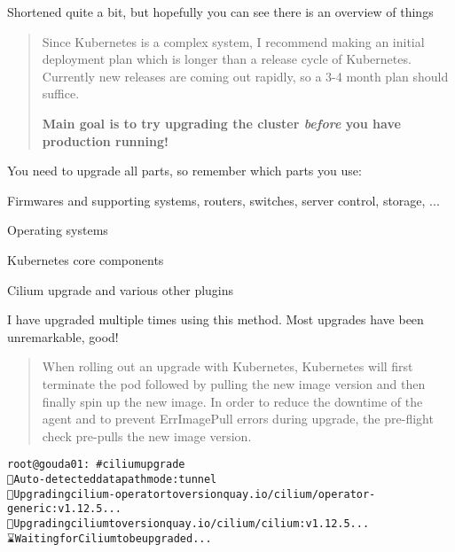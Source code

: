 \documentclass[Screen16to9,17pt]{foils}
\begin{document}
Shortened quite a bit, but hopefully you can see there is an overview of things







\begin{quote}
Since Kubernetes is a complex system, I recommend making an initial deployment plan which is longer than a release cycle of Kubernetes. Currently new releases are coming out rapidly, so a 3-4 month plan should suffice.

{\bf Main goal is to try upgrading the cluster \emph{before} you have production running!}
\end{quote}


You need to upgrade all parts, so remember which parts you use:
\begin{list2}
\item Firmwares and supporting systems, routers, switches, server control, storage, ...
\item Operating systems
\item Kubernetes core components
\item Cilium upgrade and various other plugins
\end{list2}

I have upgraded multiple times using this method. Most upgrades have been unremarkable, good!


\begin{quote}
When rolling out an upgrade with Kubernetes, Kubernetes will first terminate the pod followed by pulling the new image version and then finally spin up the new image. In order to reduce the downtime of the agent and to prevent ErrImagePull errors during upgrade, the pre-flight check pre-pulls the new image version.
\end{quote}

\begin{alltt}\footnotesize
root@gouda01:~# cilium upgrade
🔮 Auto-detected datapath mode: tunnel
🚀 Upgrading cilium-operator to version quay.io/cilium/operator-generic:v1.12.5...
🚀 Upgrading cilium to version quay.io/cilium/cilium:v1.12.5...
⌛ Waiting for Cilium to be upgraded...

\end{alltt}
\end{document}

